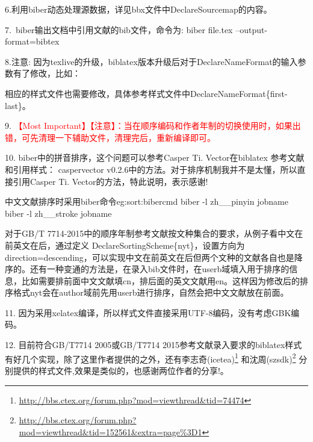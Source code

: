 \documentclass[11pt]{article} %
\begin{document}
6.利用biber动态处理源数据，详见bbx文件中DeclareSourcemap的内容。

7.~biber输出文档中引用文献的bib文件，命令为:
biber file.tex --output-format=bibtex

8.注意: 因为texlive的升级，biblatex版本升级后对于DeclareNameFormat的输入参数有了修改，比如：

相应的样式文件也需要修改，具体参考样式文件中DeclareNameFormat\{first-last\}。

9. \textcolor{red}{\HandRight \heiti 【Most Important】【注意】：当在顺序编码和作者年制的切换使用时，如果出错，可先清理一下辅助文件，清理完后，重新编译即可。}

10. {\heiti biber中的拼音排序，这个问题可以参考Casper Ti. Vector在biblatex 参考文献和引用样式： caspervector v0.2.6中的方法。对于排序机制我并不是太懂，所以直接引用Casper Ti. Vector的方法，特此说明，表示感谢!}

\begin{codetex}{中文文献排序时采用biber命令}{eg:sort:bibercmd}
biber -l zh__pinyin jobname
biber -l zh__stroke jobname
\end{codetex}

对于GB/T 7714-2015中的顺序年制参考文献按文种集合的要求，从例子看中文在前英文在后，通过定义
DeclareSortingScheme\{nyt\}，设置方向为direction=descending，可以实现中文在前英文在后但两个文种的文献各自也是降序的。还有一种变通的方法是，在录入bib文件时，在userb域填入用于排序的信息，比如需要排前面中文文献填cn，排后面的英文文献用en。这样因为修改后的排序格式nyt会在author域前先用userb进行排序，自然会把中文文献放在前面。

11. 因为采用xelatex编译，所以样式文件直接采用UTF-8编码，没有考虑GBK编码。

12. 目前符合GB/T7714 2005或GB/T7714 2015参考文献录入要求的biblatex样式有好几个实现，除了这里作者提供的之外，还有李志奇(icetea)\footnote{\url{http://bbs.ctex.org/forum.php?mod=viewthread&tid=74474}} 和沈周(szsdk)\footnote{\url{http://bbs.ctex.org/forum.php?mod=viewthread&tid=152561&extra=page\%3D1}} 分别提供的样式文件,效果是类似的，也感谢两位作者的分享!。
\end{document}
